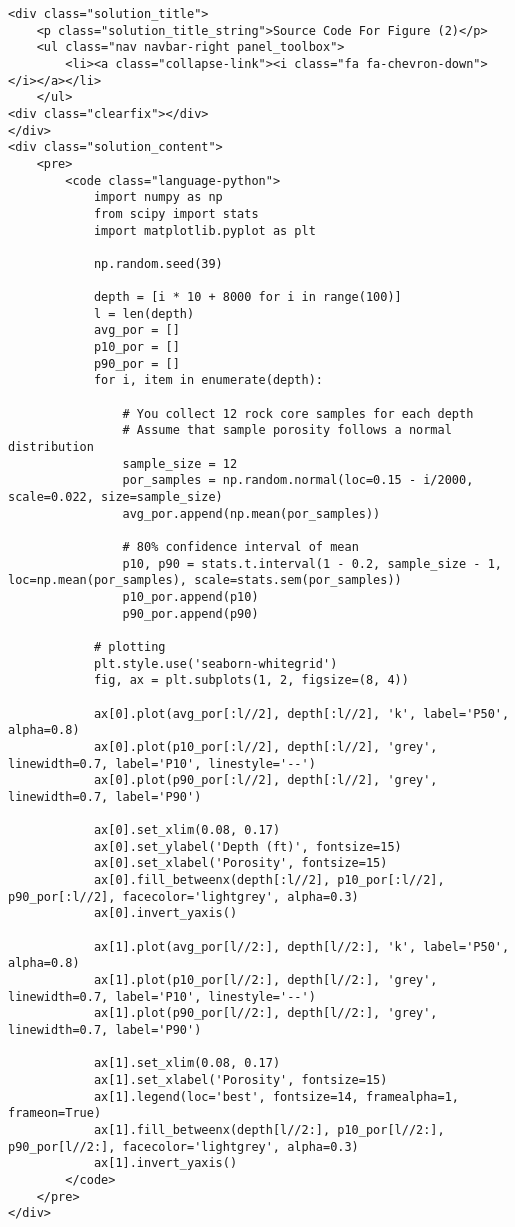 \documentclass[11pt]{article}
\begin{document}
    \begin{verbatim}
<div class="solution_title">
    <p class="solution_title_string">Source Code For Figure (2)</p>
    <ul class="nav navbar-right panel_toolbox">
        <li><a class="collapse-link"><i class="fa fa-chevron-down"></i></a></li>
    </ul>
<div class="clearfix"></div>
</div>
<div class="solution_content">
    <pre>
        <code class="language-python">
            import numpy as np
            from scipy import stats
            import matplotlib.pyplot as plt

            np.random.seed(39)

            depth = [i * 10 + 8000 for i in range(100)]
            l = len(depth)
            avg_por = []
            p10_por = []
            p90_por = []
            for i, item in enumerate(depth):

                # You collect 12 rock core samples for each depth
                # Assume that sample porosity follows a normal distribution
                sample_size = 12
                por_samples = np.random.normal(loc=0.15 - i/2000, scale=0.022, size=sample_size)
                avg_por.append(np.mean(por_samples))
                
                # 80% confidence interval of mean
                p10, p90 = stats.t.interval(1 - 0.2, sample_size - 1, loc=np.mean(por_samples), scale=stats.sem(por_samples))
                p10_por.append(p10)
                p90_por.append(p90)
            
            # plotting
            plt.style.use('seaborn-whitegrid')
            fig, ax = plt.subplots(1, 2, figsize=(8, 4))

            ax[0].plot(avg_por[:l//2], depth[:l//2], 'k', label='P50', alpha=0.8)
            ax[0].plot(p10_por[:l//2], depth[:l//2], 'grey', linewidth=0.7, label='P10', linestyle='--')
            ax[0].plot(p90_por[:l//2], depth[:l//2], 'grey', linewidth=0.7, label='P90')

            ax[0].set_xlim(0.08, 0.17)
            ax[0].set_ylabel('Depth (ft)', fontsize=15)
            ax[0].set_xlabel('Porosity', fontsize=15)
            ax[0].fill_betweenx(depth[:l//2], p10_por[:l//2], p90_por[:l//2], facecolor='lightgrey', alpha=0.3)
            ax[0].invert_yaxis()

            ax[1].plot(avg_por[l//2:], depth[l//2:], 'k', label='P50', alpha=0.8)
            ax[1].plot(p10_por[l//2:], depth[l//2:], 'grey', linewidth=0.7, label='P10', linestyle='--')
            ax[1].plot(p90_por[l//2:], depth[l//2:], 'grey', linewidth=0.7, label='P90')

            ax[1].set_xlim(0.08, 0.17)
            ax[1].set_xlabel('Porosity', fontsize=15)
            ax[1].legend(loc='best', fontsize=14, framealpha=1, frameon=True)
            ax[1].fill_betweenx(depth[l//2:], p10_por[l//2:], p90_por[l//2:], facecolor='lightgrey', alpha=0.3)
            ax[1].invert_yaxis()
        </code>
    </pre>
</div>
\end{verbatim}
\end{document}
